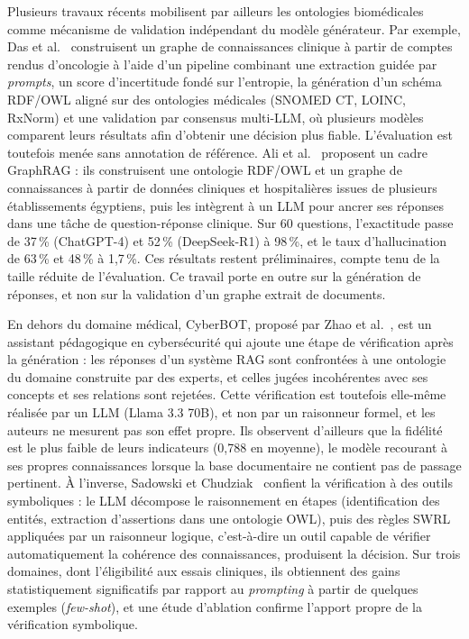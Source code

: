 Plusieurs travaux récents mobilisent par ailleurs les ontologies biomédicales comme mécanisme de validation indépendant du modèle générateur. Par exemple, Das et al.~\cite{das2026clinical} construisent un graphe de connaissances clinique à partir de comptes rendus d'oncologie à l'aide d'un pipeline combinant une extraction guidée par \textit{prompts}, un score d'incertitude fondé sur l'entropie, la génération d'un schéma RDF/OWL aligné sur des ontologies médicales (SNOMED CT, LOINC, RxNorm) et une validation par consensus multi-LLM, où plusieurs modèles comparent leurs résultats afin d'obtenir une décision plus fiable. L'évaluation est toutefois menée sans annotation de référence. Ali et al.~\cite{ali2026ontology} proposent un cadre GraphRAG : ils construisent une ontologie RDF/OWL et un graphe de connaissances à partir de données cliniques et hospitalières issues de plusieurs établissements égyptiens, puis les intègrent à un LLM pour ancrer ses réponses dans une tâche de question-réponse clinique. Sur 60 questions, l'exactitude passe de 37\,\% (ChatGPT-4) et 52\,\% (DeepSeek-R1) à 98\,\%, et le taux d'hallucination de 63\,\% et 48\,\% à 1,7\,\%. Ces résultats restent préliminaires, compte tenu de la taille réduite de l'évaluation. Ce travail porte en outre sur la génération de réponses, et non sur la validation d'un graphe extrait de documents.

En dehors du domaine médical, CyberBOT, proposé par Zhao et al.~\cite{zhao2025cyberbot}, est un assistant pédagogique en cybersécurité qui ajoute une étape de vérification après la génération : les réponses d'un système RAG sont confrontées à une ontologie du domaine construite par des experts, et celles jugées incohérentes avec ses concepts et ses relations sont rejetées. Cette vérification est toutefois elle-même réalisée par un LLM (Llama 3.3 70B), et non par un raisonneur formel, et les auteurs ne mesurent pas son effet propre. Ils observent d'ailleurs que la fidélité est le plus faible de leurs indicateurs (0,788 en moyenne), le modèle recourant à ses propres connaissances lorsque la base documentaire ne contient pas de passage pertinent. À l'inverse, Sadowski et Chudziak~\cite{sadowski2026structured} confient la vérification à des outils symboliques : le LLM décompose le raisonnement en étapes (identification des entités, extraction d'assertions dans une ontologie OWL), puis des règles SWRL appliquées par un raisonneur logique, c'est-à-dire un outil capable de vérifier automatiquement la cohérence des connaissances, produisent la décision. Sur trois domaines, dont l'éligibilité aux essais cliniques, ils obtiennent des gains statistiquement significatifs par rapport au \textit{prompting} à partir de quelques exemples (\textit{few-shot}), et une étude d'ablation confirme l'apport propre de la vérification symbolique.

